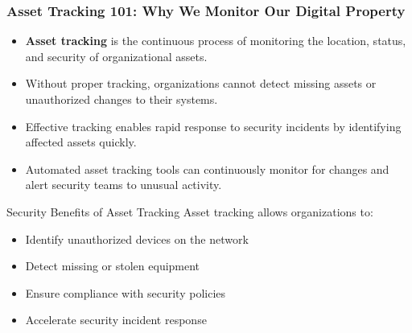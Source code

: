 \documentclass{beamer}
\begin{document}
\begin{frame}
\frametitle{Asset Tracking 101: Why We Monitor Our Digital Property}
\begin{itemize}
\item \textbf{Asset tracking} is the continuous process of monitoring the location, status, and security of organizational assets.
\item Without proper tracking, organizations cannot detect missing assets or unauthorized changes to their systems.
\item Effective tracking enables rapid response to security incidents by identifying affected assets quickly.
\item Automated asset tracking tools can continuously monitor for changes and alert security teams to unusual activity.
\end{itemize}

\begin{alertblock}{Security Benefits of Asset Tracking}
Asset tracking allows organizations to:
\begin{itemize}
\item Identify unauthorized devices on the network
\item Detect missing or stolen equipment
\item Ensure compliance with security policies
\item Accelerate security incident response
\end{itemize}
\end{alertblock}
\end{frame}
\end{document}
